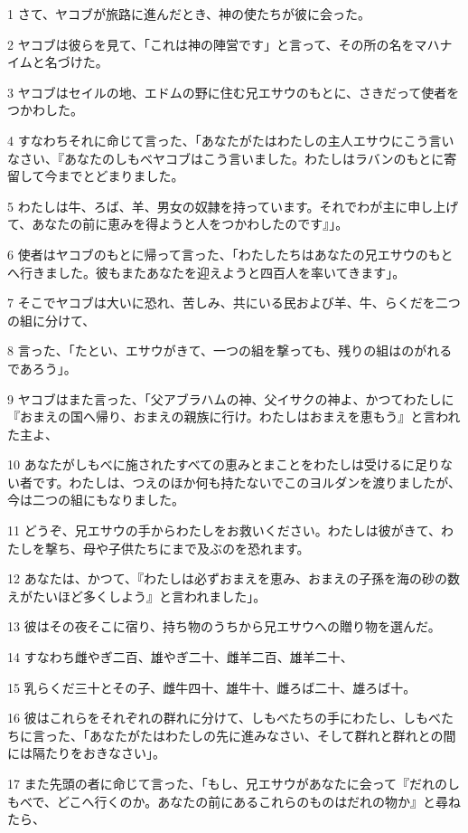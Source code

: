\par 1 さて、ヤコブが旅路に進んだとき、神の使たちが彼に会った。
\par 2 ヤコブは彼らを見て、「これは神の陣営です」と言って、その所の名をマハナイムと名づけた。
\par 3 ヤコブはセイルの地、エドムの野に住む兄エサウのもとに、さきだって使者をつかわした。
\par 4 すなわちそれに命じて言った、「あなたがたはわたしの主人エサウにこう言いなさい、『あなたのしもべヤコブはこう言いました。わたしはラバンのもとに寄留して今までとどまりました。
\par 5 わたしは牛、ろば、羊、男女の奴隷を持っています。それでわが主に申し上げて、あなたの前に恵みを得ようと人をつかわしたのです』」。
\par 6 使者はヤコブのもとに帰って言った、「わたしたちはあなたの兄エサウのもとへ行きました。彼もまたあなたを迎えようと四百人を率いてきます」。
\par 7 そこでヤコブは大いに恐れ、苦しみ、共にいる民および羊、牛、らくだを二つの組に分けて、
\par 8 言った、「たとい、エサウがきて、一つの組を撃っても、残りの組はのがれるであろう」。
\par 9 ヤコブはまた言った、「父アブラハムの神、父イサクの神よ、かつてわたしに『おまえの国へ帰り、おまえの親族に行け。わたしはおまえを恵もう』と言われた主よ、
\par 10 あなたがしもべに施されたすべての恵みとまことをわたしは受けるに足りない者です。わたしは、つえのほか何も持たないでこのヨルダンを渡りましたが、今は二つの組にもなりました。
\par 11 どうぞ、兄エサウの手からわたしをお救いください。わたしは彼がきて、わたしを撃ち、母や子供たちにまで及ぶのを恐れます。
\par 12 あなたは、かつて、『わたしは必ずおまえを恵み、おまえの子孫を海の砂の数えがたいほど多くしよう』と言われました」。
\par 13 彼はその夜そこに宿り、持ち物のうちから兄エサウへの贈り物を選んだ。
\par 14 すなわち雌やぎ二百、雄やぎ二十、雌羊二百、雄羊二十、
\par 15 乳らくだ三十とその子、雌牛四十、雄牛十、雌ろば二十、雄ろば十。
\par 16 彼はこれらをそれぞれの群れに分けて、しもべたちの手にわたし、しもべたちに言った、「あなたがたはわたしの先に進みなさい、そして群れと群れとの間には隔たりをおきなさい」。
\par 17 また先頭の者に命じて言った、「もし、兄エサウがあなたに会って『だれのしもべで、どこへ行くのか。あなたの前にあるこれらのものはだれの物か』と尋ねたら、

